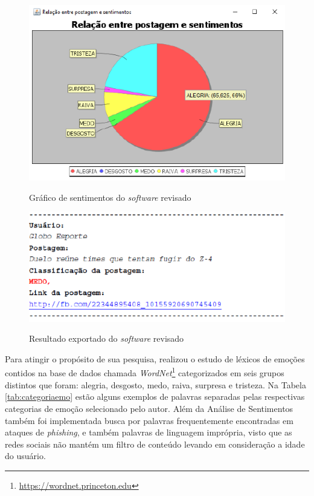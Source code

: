\begin{figure}[!h]
\centering 
\caption{Gráfico de sentimentos do \textit{software} revisado}
\includegraphics[scale=0.8]{imagens/graficodesentimentosfilipe.png}
\label{fig:graficotccfilipe}
\end{figure}

\begin{figure}[!h]
\centering 
\caption{Resultado exportado do \textit{software} revisado}
\includegraphics[scale=0.60]{imagens/exportadofilipe.png}
\label{fig:exportadotccfilipe}
\end{figure}

\newpage
Para atingir o propósito de sua pesquisa,  realizou o estudo de léxicos de emoções contidos na base de dados chamada \textit{WordNet}\footnote{\url{https://wordnet.princeton.edu}} categorizados em seis grupos distintos que foram: alegria, desgosto, medo, raiva, surpresa e tristeza. Na Tabela \ref{tab:categoriaemo} estão alguns exemplos de palavras separadas pelas respectivas categorias de emoção selecionado pelo autor. Além da Análise de Sentimentos também foi implementada busca por palavras frequentemente encontradas em ataques de \textit{phishing},  e também palavras de linguagem imprópria, visto que as redes sociais não mantém um filtro de conteúdo levando em consideração a idade do usuário.

